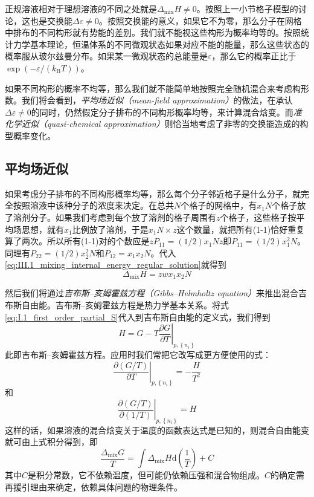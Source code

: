 \documentclass[main.tex]{subfiles}
\begin{document}
正规溶液相对于理想溶液的不同之处就是$\Delta_\text{mix}H\neq 0$。按照上一小节格子模型的讨论，这也是交换能$\Delta\varepsilon\neq 0$。按照交换能的意义，如果它不为零，那么分子在网格中排布的不同构形就有势能的差别。我们就不能视这些构形为概率均等的。按照统计力学基本理论，恒温体系的不同微观状态如果对应不能的能量，那么这些状态的概率服从玻尔兹曼分布。如果某一微观状态的总能量是$\varepsilon$，那么它的概率正比于$\exp\left(-\varepsilon/\left(k_\text{B}T\right)\right)$。

如果不同构形的概率不均等，那么我们就不能简单地按照完全随机混合来考虑构形数。我们将会看到，\emph{平均场近似（mean-field approximation）}的做法，在承认$\Delta\varepsilon\neq 0$的同时，仍然假定分子排布的不同构形概率均等，来计算混合焓变。而\emph{准化学近似（quasi-chemical approximation）}则恰当地考虑了非零的交换能造成的构型概率变化。

\subsection{平均场近似}
如果考虑分子排布的不同构形概率均等，那么每个分子邻近格子是什么分子，就完全按照溶液中该种分子的浓度来决定。在总共$N$个格子的网格中，有$x_1N$个格子放了溶剂分子。如果我们考虑到每个放了溶剂的格子周围有$z$个格子，这些格子按平均场思想，就有$x_1$比例放了溶剂，于是$x_1 N\times z$这个数量，就把所有(1-1)恰好重复算了两次。所以所有(1-1)对的个数应是$zP_{11}=(1/2)x_1Nz$即$P_{11}=(1/2)x_1^2N$。同理有$P_{22}=(1/2)x_2^2N$和$P_{12}=x_1x_2N$。代入\eqref{eq:III.1_mixing_internal_energy_regular_solution}就得到
\begin{equation}\label{eq:III.2_mixing_internal_energy_regular_solution_mean_field}
  \Delta_\text{mix}H=zwx_1x_2N
\end{equation}

然后我们将通过\emph{吉布斯--亥姆霍兹方程（Gibbs--Helmholtz equation）}来推出混合吉布斯自由能。吉布斯--亥姆霍兹方程是热力学基本关系。将式\eqref{eq:I.1_first_order_partial_S}代入到吉布斯自由能的定义式，我们得到
\begin{equation}\label{eq:III.2_gibbs_helmholtz_eq}
  H=G-T\left.\frac{\partial G}{\partial T}\right|_{p,\left\{n_i\right\}}
\end{equation}
此即吉布斯--亥姆霍兹方程。应用时我们常把它改写成更方便使用的式：
\[
  \left.\frac{\partial\left(G/T\right)}{\partial T}\right|_{p,\left\{n_i\right\}}=-\frac{H}{T^2}
\]
和
\[\left.\frac{\partial\left(G/T\right)}{\partial\left(1/T\right)}\right|_{p,\left\{n_i\right\}}=H\]
这样的话，如果溶液的混合焓变关于温度的函数表达式是已知的，则混合自由能变就可由上式积分得到，即
\[\frac{\Delta_\text{mix}G}{T}=\int\Delta_\text{mix}H\mathrm{d}\left(\frac{1}{T}\right)+C\]
其中$C$是积分常数，它不依赖温度，但可能仍依赖压强和混合物组成。$C$的确定需再援引理由来确定，依赖具体问题的物理条件。
\end{document}
